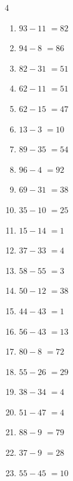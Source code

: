 \begin{multicols}{4}
\begin{enumerate}
  \item $93-11$
        $=82$

  \item $94-8$
        $=86$

  \item $82-31$
        $=51$

  \item $62-11$
        $=51$

  \item $62-15$
        $=47$

  \item $13-3$
        $=10$

  \item $89-35$
        $=54$

  \item $96-4$
        $=92$

  \item $69-31$
        $=38$

  \item $35-10$
        $=25$

  \item $15-14$
        $=1$

  \item $37-33$
        $=4$

  \item $58-55$
        $=3$

  \item $50-12$
        $=38$

  \item $44-43$
        $=1$

  \item $56-43$
        $=13$

  \item $80-8$
        $=72$

  \item $55-26$
        $=29$

  \item $38-34$
        $=4$

  \item $51-47$
        $=4$

  \item $88-9$
        $=79$

  \item $37-9$
        $=28$

  \item $55-45$
        $=10$

\columnbreak %


\end{enumerate}
\end{multicols}
